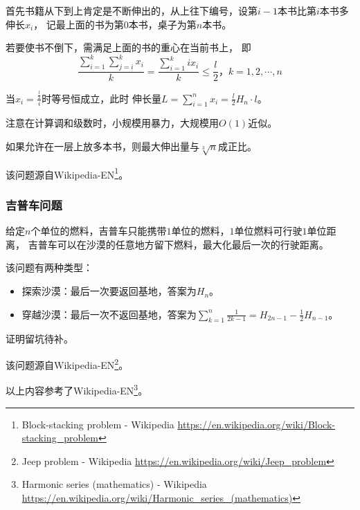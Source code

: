 首先书籍从下到上肯定是不断伸出的，从上往下编号，设第$i-1$本书比第$i$本书多伸长$x_i$，
记最上面的书为第$0$本书，桌子为第$n$本书。

若要使书不倒下，需满足上面的书的重心在当前书上，
即
\begin{displaymath}
	\frac{\sum_{i=1}^k{\sum_{j=i}^k{x_i}}}{k}=\frac{\sum_{i=1}^k{ix_i}}{k}\leq \frac{l}{2}，k=1,2,\cdots,n
\end{displaymath}

当$x_i=\frac{\frac{l}{2}}{i}$时等号恒成立，此时
伸长量$\displaystyle L=\sum_{i=1}^n{x_i}=\frac{l}{2}H_n\cdot l$。

注意在计算调和级数时，小规模用暴力，大规模用$O(1)$近似。

如果允许在一层上放多本书，则最大伸出量与$\sqrt[3]{n}$成正比。

该问题源自Wikipedia-EN\footnote{Block-stacking problem - Wikipedia
	\url{https://en.wikipedia.org/wiki/Block-stacking\_problem}}。
\subsubsection{吉普车问题}

给定$n$个单位的燃料，吉普车只能携带$1$单位的燃料，$1$单位燃料可行驶$1$单位距离，
吉普车可以在沙漠的任意地方留下燃料，最大化最后一次的行驶距离。

该问题有两种类型：
\begin{itemize}
    \item 探索沙漠：最后一次要返回基地，答案为$H_n$。
    \item 穿越沙漠：最后一次不返回基地，答案为$\displaystyle
    \sum_{k=1}^n{\frac{1}{2k-1}}=H_{2n-1}-\frac{1}{2}H_{n-1}$。
\end{itemize}

证明留坑待补。

该问题源自Wikipedia-EN\footnote{Jeep problem - Wikipedia
	\url{https://en.wikipedia.org/wiki/Jeep\_problem}}。

以上内容参考了Wikipedia-EN\footnote{Harmonic series (mathematics) - Wikipedia
	\url{https://en.wikipedia.org/wiki/Harmonic\_series\_(mathematics)}}。
